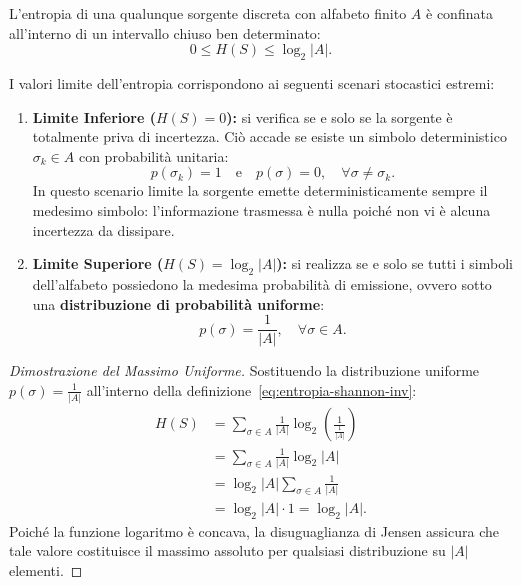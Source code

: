 L'entropia di una qualunque sorgente discreta con alfabeto finito $A$ \`e confinata all'interno di un intervallo chiuso ben determinato:
\begin{equation}
  0 \le H(S) \le \log_2 |A|.
  \label{eq:intervallo-entropia}
\end{equation}

\begin{property}
I valori limite dell'entropia corrispondono ai seguenti scenari stocastici estremi:
\begin{enumerate}
  \item \textbf{Limite Inferiore ($H(S) = 0$):} si verifica se e solo se la sorgente \`e totalmente priva di incertezza. Ci\`o accade se esiste un simbolo deterministico $\sigma_k \in A$ con probabilit\`a unitaria:
  \begin{equation}
    p(\sigma_k) = 1 \quad \text{e} \quad p(\sigma) = 0, \quad \forall \sigma \neq \sigma_k.
  \end{equation}
  In questo scenario limite la sorgente emette deterministicamente sempre il medesimo simbolo: l'informazione trasmessa \`e nulla poich\'e non vi \`e alcuna incertezza da dissipare.
  \item \textbf{Limite Superiore ($H(S) = \log_2 |A|$):} si realizza se e solo se tutti i simboli dell'alfabeto possiedono la medesima probabilit\`a di emissione, ovvero sotto una \textbf{distribuzione di probabilit\`a uniforme}:
  \begin{equation}
    p(\sigma) = \frac{1}{|A|}, \quad \forall \sigma \in A.
  \end{equation}
\end{enumerate}
\end{property}

\begin{proof}[Dimostrazione del Massimo Uniforme]
Sostituendo la distribuzione uniforme $p(\sigma) = \frac{1}{|A|}$ all'interno della definizione~\eqref{eq:entropia-shannon-inv}:
\begin{align}
  H(S) &= \sum_{\sigma \in A} \frac{1}{|A|} \log_2 \left(\frac{1}{\frac{1}{|A|}}\right) \nonumber \\
  &= \sum_{\sigma \in A} \frac{1}{|A|} \log_2 |A| \nonumber \\
  &= \log_2 |A| \sum_{\sigma \in A} \frac{1}{|A|} \nonumber \\
  &= \log_2 |A| \cdot 1 = \log_2 |A|.
\end{align}
Poich\'e la funzione logaritmo \`e concava, la disuguaglianza di Jensen assicura che tale valore costituisce il massimo assoluto per qualsiasi distribuzione su $|A|$ elementi.
\end{proof}

